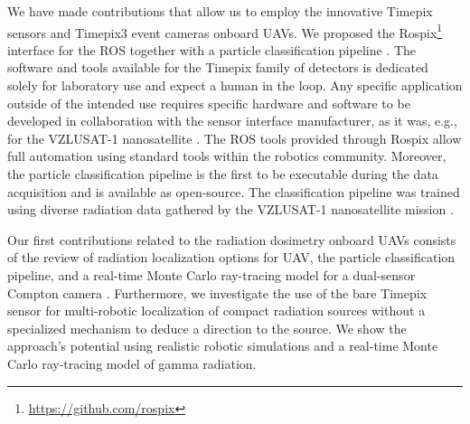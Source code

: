 \documentclass[a4paper,11pt,twoside,openright]{book}
\begin{document}
We have made contributions that allow us to employ the innovative Timepix sensors and Timepix3 event cameras onboard \acp{UAV}.
We proposed the Rospix\footnote{\url{https://github.com/rospix}} interface \cite{baca2018rospix} for the \acl{ROS} together with a particle classification pipeline \cite{baca2019timepix}.
The software and tools available for the Timepix family of detectors is dedicated solely for laboratory use and expect a human in the loop.
Any specific application outside of the intended use requires specific hardware and software to be developed in collaboration with the sensor interface manufacturer, as it was, e.g., for the VZLUSAT-1 nanosatellite \cite{baca2016embedded}.
The \ac{ROS} tools provided through Rospix allow full automation using standard tools within the robotics community.
Moreover, the particle classification pipeline is the first to be executable during the data acquisition and is available as open-source.
The classification pipeline was trained using diverse radiation data gathered by the VZLUSAT-1 nanosatellite mission \cite{baca2018timepix}.

Our first contributions related to the radiation dosimetry onboard \acp{UAV} consists of the review of radiation localization options for \acl{UAV}, the particle classification pipeline, and a real-time Monte Carlo ray-tracing model for a dual-sensor Compton camera \cite{baca2019timepix}.
Furthermore, we investigate the use of the bare Timepix sensor for multi-robotic localization of compact radiation sources \cite{stibinger2020localization} without a specialized mechanism to deduce a direction to the source.
We show the approach's potential using realistic robotic simulations and a real-time Monte Carlo ray-tracing model of gamma radiation.
\end{document}
